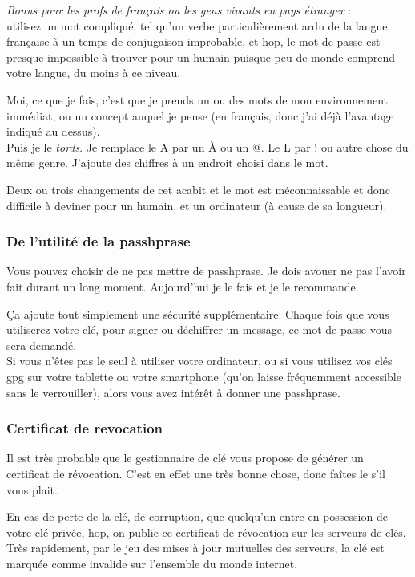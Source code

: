 \emph{Bonus pour les profs de français ou les gens vivants en pays
étranger} :\\utilisez un mot compliqué, tel qu'un verbe particulièrement
ardu de la langue française à un temps de conjugaison improbable, et
hop, le mot de passe est presque impossible à trouver pour un humain
puisque peu de monde comprend votre langue, du moins à ce niveau.

Moi, ce que je fais, c'est que je prends un ou des mots de mon
environnement immédiat, ou un concept auquel je pense (en français, donc
j'ai déjà l'avantage indiqué au dessus).\\Puis je le \emph{tords}. Je
remplace le A par un À ou un @. Le L par ! ou autre chose du même genre.
J'ajoute des chiffres à un endroit choisi dans le mot.

Deux ou trois changements de cet acabit et le mot est méconnaissable et
donc difficile à deviner pour un humain, et un ordinateur (à cause de sa
longueur).

\subsubsection{De l'utilité de la passhprase}\label{de-lutilituxe9-de-la-passhprase}

Vous pouvez choisir de ne pas mettre de passhprase. Je dois avouer ne
pas l'avoir fait durant un long moment. Aujourd'hui je le fais et je le
recommande.

Ça ajoute tout simplement une sécurité supplémentaire. Chaque fois que
vous utiliserez votre clé, pour signer ou déchiffrer un message, ce mot
de passe vous sera demandé.\\Si vous n'êtes pas le seul à utiliser votre
ordinateur, ou si vous utilisez vos clés gpg sur votre tablette ou votre
smartphone (qu'on laisse fréquemment accessible sans le verrouiller),
alors vous avez intérêt à donner une passhprase.

\subsubsection{Certificat de revocation}\label{certificat-de-revocation}

Il est très probable que le gestionnaire de clé vous propose de générer
un certificat de révocation. C'est en effet une très bonne chose, donc
faîtes le s'il vous plait.

En cas de perte de la clé, de corruption, que quelqu'un entre en
possession de votre clé privée, hop, on publie ce certificat de
révocation sur les serveurs de clés. Très rapidement, par le jeu des
mises à jour mutuelles des serveurs, la clé est marquée comme invalide
sur l'ensemble du monde internet.

